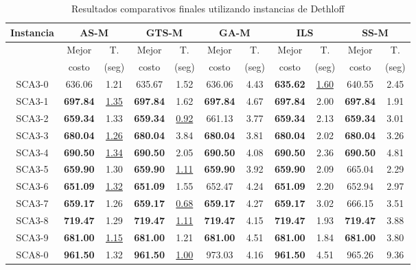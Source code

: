 \begin{table}[h]
\caption{ Resultados comparativos finales utilizando instancias de Dethloff}
\centering
\scriptsize
\begin{tabular*}{1.00\textwidth}{@{\extracolsep{\fill}} |c||c c|c c|c c|c c|c c|}
\hline
\textbf{Instancia} & \multicolumn{2}{c|}{\textbf{AS-M}} & \multicolumn{2}{c|}{\textbf{GTS-M}} & 
\multicolumn{2}{c|}{\textbf{GA-M}} & \multicolumn{2}{c|}{\textbf{ILS}} & \multicolumn{2}{c|}{\textbf{SS-M}} \\\hline
 & Mejor & T. & Mejor & T. & Mejor & T. & Mejor & T. & Mejor & T.\\
 & costo & (seg) & costo & (seg) & costo & (seg) & costo & (seg) & costo & (seg)\\\hline\hline
SCA3-0 & 636.06 & 1.21 & 635.67 & 1.52 & 636.06 & 4.43 & \textbf{635.62} & \underline{1.60} & 640.55 & 2.45\\
SCA3-1 & \textbf{697.84} & \underline{1.35} & \textbf{697.84} & 1.62 & \textbf{697.84} & 4.67 & \textbf{697.84} & 2.00 & \textbf{697.84} & 1.91\\
SCA3-2 & \textbf{659.34} & 1.33 & \textbf{659.34} & \underline{0.92} & 661.13 & 3.77 & \textbf{659.34} & 2.13 & \textbf{659.34} & 3.01\\
SCA3-3 & \textbf{680.04} & \underline{1.26} & \textbf{680.04} & 3.84 & \textbf{680.04} & 3.81 & \textbf{680.04} & 2.02 & \textbf{680.04} & 3.26\\
SCA3-4 & \textbf{690.50} & \underline{1.34} & \textbf{690.50} & 2.05 & \textbf{690.50} & 4.08 & \textbf{690.50} & 2.36 & \textbf{690.50} & 4.81\\
SCA3-5 & \textbf{659.90} & 1.30 & \textbf{659.90} & \underline{1.11} & \textbf{659.90} & 3.92 & \textbf{659.90} & 2.09 & 665.04 & 2.29\\
SCA3-6 & \textbf{651.09} & \underline{1.32} & \textbf{651.09} & 1.55 & 652.47 & 4.24 & \textbf{651.09} & 2.20 & 652.94 & 2.97\\
SCA3-7 & \textbf{659.17} & 1.26 & \textbf{659.17} & \underline{0.68} & \textbf{659.17} & 4.27 & \textbf{659.17} & 3.02 & 666.15 & 3.51\\
SCA3-8 & \textbf{719.47} & 1.29 & \textbf{719.47} & \underline{1.11} & \textbf{719.47} & 4.15 & \textbf{719.47} & 1.93 & \textbf{719.47} & 3.88\\
SCA3-9 & \textbf{681.00} & \underline{1.15} & \textbf{681.00} & 1.21 & \textbf{681.00} & 4.51 & \textbf{681.00} & 1.84 & \textbf{681.00} & 3.80\\
SCA8-0 & \textbf{961.50} & 1.32 & \textbf{961.50} & \underline{1.00} & 973.03 & 4.16 & \textbf{961.50} & 4.51 & 965.26 & 9.36\\

\end{tabular*}
\end{table}
